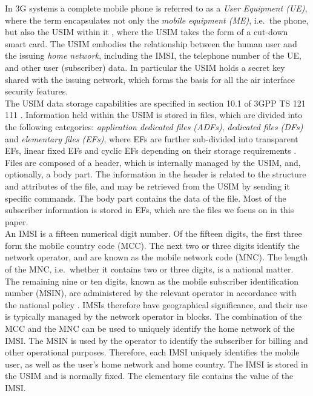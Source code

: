 \documentclass{acm_proc_article-sp}
\begin{document}
In 3G systems a complete mobile phone is referred to as a \emph{User Equipment (UE)\@}, where the term encapsulates not only the \emph{mobile equipment (ME)\@}, i.e.\ the phone, but also the USIM within it \cite{3GPP_TR_21_905}, where the USIM takes the form of a cut-down smart card. The USIM embodies the relationship between the human user and the issuing \emph{home network}, including the IMSI, the telephone number of the UE, and other user (subscriber) data.  In particular the USIM holds a secret key shared with the issuing network, which forms the basis for all the air interface security features. \\


The USIM data storage capabilities are specified in section 10.1 of 3GPP TS 121 111 \cite{ETSI_TS_121_111:2008}. Information held within the USIM is stored in files, which are divided into the following categories:  \emph{application dedicated files (ADFs)}, \emph{dedicated files (DFs)} and \emph{elementary files (EFs)}, where EFs are further sub-divided into transparent EFs, linear fixed EFs and cyclic EFs depending on their storage requirements \cite{3GPP_TS_31_101}. Files are composed of a header, which is internally managed by the USIM, and, optionally, a body part. The information in the header is related to the structure and attributes of the file, and may be retrieved from the USIM by sending it specific commands. The body part contains the data of the file. Most of the subscriber information is stored in EFs, which are the files we focus on in this paper. \\

An IMSI is a fifteen numerical digit number. Of the fifteen digits, the first three form the mobile country code (MCC). The next two or three digits identify the network operator, and are known as the mobile network code (MNC). The length of the MNC, i.e.\ whether it contains two or three digits, is a national matter. The remaining nine or ten digits, known as the mobile subscriber identification number (MSIN), are administered by the relevant operator in accordance with the national policy \cite{3GPP_TS_23_003:2003,ITU_T_E_212}. IMSIs therefore have geographical significance, and their use is typically managed by the network operator in blocks. The combination of the MCC and the MNC can be used to uniquely identify the home network of the IMSI. The MSIN is used by the operator to identify the subscriber for billing and other operational purposes. Therefore, each IMSI uniquely identifies the mobile user, as well as the user's home network and home country. The IMSI is stored in the USIM and is normally fixed. The elementary file \emph{} contains the value of the IMSI.   
\end{document}
